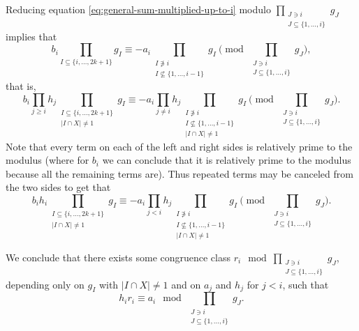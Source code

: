 \documentclass[11pt,letterpaper]{amsart}
\newcommand{\abs}[1]{\left\lvert #1\right\rvert}
\theoremstyle{definition}
\begin{document}
Reducing equation \eqref{eq:general-sum-multiplied-up-to-i} modulo $\prod_{\substack{J \ni i \\ J \subseteq \{1, \dots, i\}}}g_J$ implies that
\[b_i\prod_{I\subseteq \{i,\ldots,2k+1\}}g_I\equiv -a_i \prod_{\substack{I \not\ni i \\ I \not\subseteq\{1, \dots, i-1\}}} g_I \pmod{\prod_{\substack{J \ni i \\ J \subseteq \{1,\ldots,i\}}} g_J},\]
that is,
\[b_i\prod_{j \ge i} h_j \prod_{\substack{I \subseteq\{i, \ldots, 2k+1\} \\ |I \cap X| \ne 1}} g_I \equiv -a_i \prod_{j \ne i}h_j \prod_{\substack{I \not\ni i \\ I \not\subseteq\{1,\ldots,i-1\}\\ \abs{I\cap X}\ne 1}}g_I \pmod{\prod_{\substack{J \ni i \\ J \subseteq \{1,\ldots,i\}}} g_J}.\]
Note that every term on each of the left and right sides is relatively prime to the modulus (where for $b_i$ we can conclude that it is relatively prime to the modulus because all the remaining terms are). Thus repeated terms may be canceled from the two sides to get that
\[b_i h_i \prod_{\substack{I \subseteq\{i, \ldots, 2k+1\} \\ |I \cap X| \ne 1}} g_I \equiv -a_i \prod_{j < i}h_j \prod_{\substack{I \not\ni i \\ I \not\subseteq\{1,\ldots,i-1\}\\ \abs{I\cap X}\ne 1}}g_I \pmod{\prod_{\substack{J \ni i \\ J \subseteq \{1,\ldots,i\}}} g_J}.\]

We conclude that there exists some congruence class $r_i \mod \prod_{\substack{J \ni i \\ J \subseteq \{1, \ldots, i\}}} g_J$, depending only on $g_I$ with $|I \cap X| \ne 1$ and on $a_j$ and $h_j$ for $j < i$, such that
\[h_ir_i \equiv a_i \mod \prod_{\substack{J \ni i \\ J \subseteq \{1, \ldots, i\}}} g_J.\]
\end{document}
